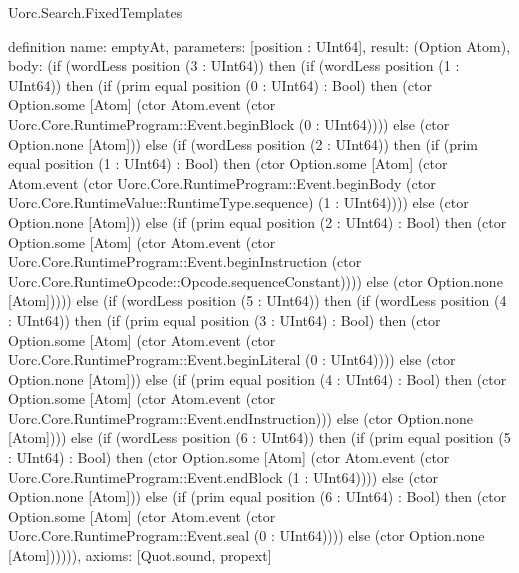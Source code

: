 \begin{lexlean}{Uorc.Search.FixedTemplates}
\begin{semanticmodule}
definition{
  name: emptyAt,
  parameters: [position : UInt64],
  result: (Option Atom),
  body: (if (wordLess position (3 : UInt64)) then (if (wordLess position (1 : UInt64)) then (if (prim equal position (0 : UInt64) : Bool) then (ctor Option.some [Atom] (ctor Atom.event (ctor Uorc.Core.RuntimeProgram::Event.beginBlock (0 : UInt64)))) else (ctor Option.none [Atom])) else (if (wordLess position (2 : UInt64)) then (if (prim equal position (1 : UInt64) : Bool) then (ctor Option.some [Atom] (ctor Atom.event (ctor Uorc.Core.RuntimeProgram::Event.beginBody (ctor Uorc.Core.RuntimeValue::RuntimeType.sequence) (1 : UInt64)))) else (ctor Option.none [Atom])) else (if (prim equal position (2 : UInt64) : Bool) then (ctor Option.some [Atom] (ctor Atom.event (ctor Uorc.Core.RuntimeProgram::Event.beginInstruction (ctor Uorc.Core.RuntimeOpcode::Opcode.sequenceConstant)))) else (ctor Option.none [Atom])))) else (if (wordLess position (5 : UInt64)) then (if (wordLess position (4 : UInt64)) then (if (prim equal position (3 : UInt64) : Bool) then (ctor Option.some [Atom] (ctor Atom.event (ctor Uorc.Core.RuntimeProgram::Event.beginLiteral (0 : UInt64)))) else (ctor Option.none [Atom])) else (if (prim equal position (4 : UInt64) : Bool) then (ctor Option.some [Atom] (ctor Atom.event (ctor Uorc.Core.RuntimeProgram::Event.endInstruction))) else (ctor Option.none [Atom]))) else (if (wordLess position (6 : UInt64)) then (if (prim equal position (5 : UInt64) : Bool) then (ctor Option.some [Atom] (ctor Atom.event (ctor Uorc.Core.RuntimeProgram::Event.endBlock (1 : UInt64)))) else (ctor Option.none [Atom])) else (if (prim equal position (6 : UInt64) : Bool) then (ctor Option.some [Atom] (ctor Atom.event (ctor Uorc.Core.RuntimeProgram::Event.seal (0 : UInt64)))) else (ctor Option.none [Atom]))))),
  axioms: [Quot.sound, propext]
}


\end{semanticmodule}
\end{lexlean}
